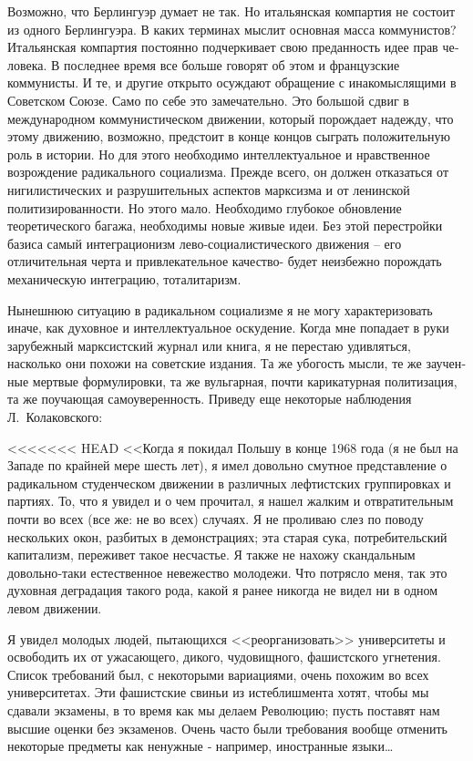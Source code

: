 \documentclass{book}
\begin{document}
{Возможно, что Берлингуэр думает не так. Но итальянская компартия не состоит из одного Берлингуэра. В каких терми­нах мыслит основная масса коммунистов? Итальянская ком­партия постоянно подчеркивает свою преданность идее прав че­ловека. В последнее время все больше говорят об этом и фран­цузские коммунисты. И те, и другие открыто осуждают обра­щение с инакомыслящими в Советском Союзе. Само по себе это замечательно. Это большой сдвиг в международном ком­мунистическом движении, который порождает надежду, что этому движению, возможно, предстоит в конце концов сы­грать положительную роль в истории. Но для этого необходимо интеллектуальное и нравственное возрождение радикального социализма. Прежде всего, он должен отказаться от нигилисти­ческих и разрушительных аспектов марксизма и от ленинской политизированности. Но этого мало. Необходимо глубокое обновление теоретического багажа, необходимы новые живые идеи. Без этой перестройки базиса самый интеграционизм лево-социалистического движения -- его отличительная 
черта и при­влекательное качество- будет неизбежно порождать механиче­скую интеграцию, тоталитаризм.

Нынешнюю ситуацию в радикальном социализме я не могу характеризовать иначе, как духовное и интеллектуальное оску­дение. Когда мне попадает в руки зарубежный марксистский журнал или книга, я не перестаю удивляться, насколько они по­хожи на советские издания. Та же убогость мысли, те же заучен­ные мертвые формулировки, та же вульгарная, почти карика­турная политизация, та же поучающая самоуверенность. При­веду еще некоторые наблюдения Л.~Колаковского:

<<<<<<< HEAD
<<Когда я покидал Польшу в конце 1968 года (я не был на Западе по крайней мере шесть лет), я имел довольно смутное представление о радикальном студенческом движении в различ­ных лефтистских группировках и партиях. То, что я увидел и о чем прочитал, я нашел жалким и отвратительным почти во всех (все же: не во всех) случаях. Я не проливаю слез по пово­ду нескольких окон, разбитых в демонстрациях; эта старая сука, потребительский капитализм, переживет такое несчастье. Я также не нахожу скандальным довольно‑таки естественное невежество молодежи. Что потрясло меня, так это духовная деградация такого рода, какой я ранее никогда не видел ни в одном левом движении.

Я увидел молодых людей, пытающихся <<реорганизовать>> университеты и освободить их от ужасающего, дикого, чудо­вищного, фашистского угнетения. Список требований был, с некоторыми вариациями, очень похожим во всех университе­тах. Эти фашистские свиньи из истеблишмента хотят, чтобы мы сдавали экзамены, в то время как мы делаем Революцию; пусть поставят нам высшие оценки без экзаменов. Очень час­то были требования вообще отменить некоторые предметы как ненужные ‑ например, иностранные языки\ldots

}
\end{document}
